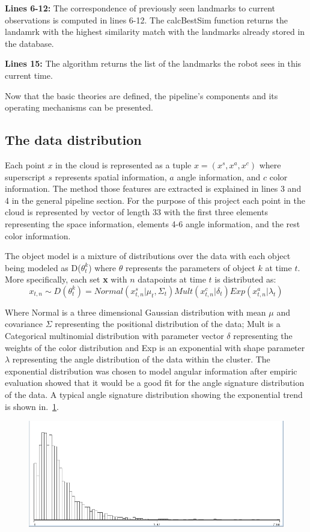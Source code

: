 \documentclass[]{article}
\begin{document}
\textbf{Lines 6-12:} The correspondence of previously seen landmarks to current observations is computed in lines 6-12. The calcBestSim function returns the landamrk with the highest similarity match with the landmarks already stored in the database.

\textbf{Lines 15:} The algorithm returns the list of the landmarks the robot sees in this current time.

Now that the basic theories are defined, the pipeline's components and its operating mechanisms can be presented.
\subsection{The data distribution}
\label{data:dist}

Each point $x$ in the cloud is represented as a tuple $x =(x^s, x^a, x^c) $ where superscript $s$ represents spatial information, $a$ angle information, and $c$ color information. The method those features are extracted is explained in lines 3 and 4 in the general pipeline section. For the purpose of this project each point in the cloud is represented by vector of length 33 with the first three elements representing the space information, elements 4-6 angle information, and the rest color information.

The object model is a mixture of distributions over the data with each object being modeled as D($\theta_t^k$) where $\theta$ represents the parameters of object $k$ at time $t$. More specifically, each set \textbf{x} with $n$ datapoints at time $t$ is distributed as:
$$ x_{t,n} \sim D(\theta_t^k) = Normal(x_{t,n}^s| \mu_t, \Sigma_t) Mult(x_{t,n}^c | \delta_t) Exp(x_{t,n}^a | \lambda_t) $$

Where Normal is a three dimensional Gaussian distribution with mean $\mu$ and covariance $\Sigma$ representing the positional distribution of the data; Mult is a Categorical multinomial distribution with parameter vector $\delta$ representing the weights of the color distribution and Exp is an exponential with shape parameter $\lambda$ representing the angle distribution of the data within the cluster. The exponential distribution was chosen to model angular information after empiric evaluation showed that it would be a good fit for the angle signature distribution of the data. A typical angle signature distribution showing the exponential trend is shown in.~\ref{pcl:kl}.

\begin{figure}
    \centering
    \includegraphics[width=.25\textwidth]{Kullback-Leibler}
    \label{pcl:kl}
\end{figure}
\end{document}
